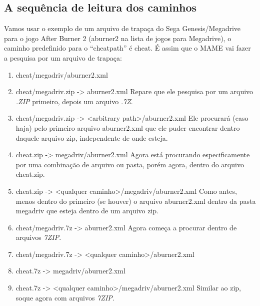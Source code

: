\documentclass[letterpaper,10pt,brazil]{sphinxmanual}
\begin{document}
\subsection{A sequência de leitura dos caminhos}
\label{advanced/paths:a-sequencia-de-leitura-dos-caminhos}
Vamos usar o exemplo de um arquivo de trapaça do Sega Genesis/Megadrive
para o jogo After Burner 2 (aburner2 na lista de jogos para Megadrive),
o caminho predefinido para o ``cheatpath'' é cheat. É assim que o MAME vai
fazer a pesquisa por um arquivo de trapaça:
\begin{enumerate}
\item {} 
cheat/megadriv/aburner2.xml

\item {} 
cheat/megadriv.zip -\textgreater{} aburner2.xml
Repare que ele pesquisa por um arquivo \emph{.ZIP} primeiro, depois um
arquivo \emph{.7Z}.

\item {} 
cheat/megadriv.zip -\textgreater{} \textless{}arbitrary path\textgreater{}/aburner2.xml
Ele procurará (caso haja) pelo primeiro arquivo aburner2.xml que
ele puder encontrar dentro daquele arquivo zip, independente de onde
esteja.

\item {} 
cheat.zip -\textgreater{} megadriv/aburner2.xml
Agora está procurando especificamente por uma combinação de arquivo
ou pasta, porém agora, dentro do arquivo cheat.zip.

\item {} 
cheat.zip -\textgreater{} \textless{}qualquer caminho\textgreater{}/megadriv/aburner2.xml
Como antes, menos dentro do primeiro (se houver) o arquivo
aburner2.xml dentro da pasta megadriv que esteja dentro de um
arquivo zip.

\item {} 
cheat/megadriv.7z -\textgreater{} aburner2.xml
Agora começa a procurar dentro de arquivos \emph{7ZIP}.

\item {} 
cheat/megadriv.7z -\textgreater{} \textless{}qualquer caminho\textgreater{}/aburner2.xml

\item {} 
cheat.7z -\textgreater{} megadriv/aburner2.xml

\item {} 
cheat.7z -\textgreater{} \textless{}qualquer caminho\textgreater{}/megadriv/aburner2.xml
Similar ao zip, soque agora com arquivos \emph{7ZIP}.

\end{enumerate}
\end{document}

